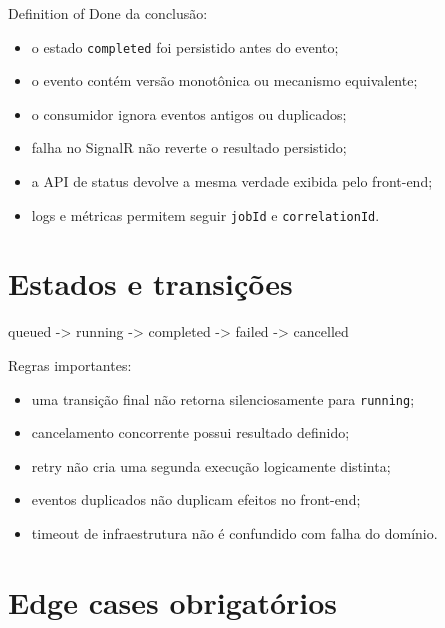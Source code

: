 \documentclass[
  10pt,
  a4paper,
  oneside]{book}
\newenvironment{Shaded}{}{}
\newcommand{\NormalTok}[1]{#1}
\providecommand{\tightlist}{%
  \setlength{\itemsep}{0pt}\setlength{\parskip}{0pt}}
\begin{document}
Definition of Done da conclusão:

\begin{itemize}
\tightlist
\item
  o estado \texttt{completed} foi persistido antes do evento;
\item
  o evento contém versão monotônica ou mecanismo equivalente;
\item
  o consumidor ignora eventos antigos ou duplicados;
\item
  falha no SignalR não reverte o resultado persistido;
\item
  a API de status devolve a mesma verdade exibida pelo front-end;
\item
  logs e métricas permitem seguir \texttt{jobId} e
  \texttt{correlationId}.
\end{itemize}

\hypertarget{estados-e-transiuxe7uxf5es}{%
\section{Estados e transições}\label{estados-e-transiuxe7uxf5es}}

\begin{Shaded}
\begin{Highlighting}[]
\NormalTok{queued {-}\textgreater{} running {-}\textgreater{} completed}
\NormalTok{                  {-}\textgreater{} failed}
\NormalTok{       {-}\textgreater{} cancelled}
\end{Highlighting}
\end{Shaded}

Regras importantes:

\begin{itemize}
\tightlist
\item
  uma transição final não retorna silenciosamente para \texttt{running};
\item
  cancelamento concorrente possui resultado definido;
\item
  retry não cria uma segunda execução logicamente distinta;
\item
  eventos duplicados não duplicam efeitos no front-end;
\item
  timeout de infraestrutura não é confundido com falha do domínio.
\end{itemize}

\hypertarget{edge-cases-obrigatuxf3rios}{%
\section{Edge cases obrigatórios}\label{edge-cases-obrigatuxf3rios}}
\end{document}
